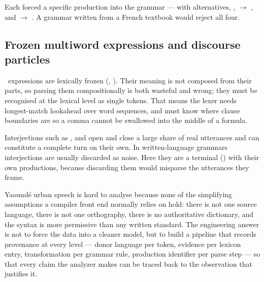 Each forced a specific production into the grammar ---  with 
alternatives, ,  $\rightarrow$ , and
 $\rightarrow$  . A grammar written from
a French textbook would reject all four.

\subsection{Frozen multiword expressions and discourse particles}

\LexiconMultiword\ expressions are lexically frozen (, ). Their meaning is not composed from their parts, so parsing them
compositionally is both wasteful and wrong; they must be recognised at the lexical level
as single  tokens. That means the lexer needs longest-match lookahead over
word sequences, and must know where clause boundaries are so a comma cannot be swallowed
into the middle of a formula.

Interjections such as ,  and  open and close a large share of
real utterances and can constitute a complete turn on their own. In written-language
grammars interjections are usually discarded as noise. Here they are a terminal
() with their own productions, because discarding them would misparse the
utterances they frame.

\begin{keypoint}
Yaound\'e urban speech is hard to analyse because none of the simplifying assumptions a
compiler front end normally relies on hold: there is not one source language, there is not
one orthography, there is no authoritative dictionary, and the syntax is more permissive
than any written standard. The engineering answer is not to force the data into a cleaner
model, but to build a pipeline that records provenance at every level --- donor language per
token, evidence per lexicon entry, transformation per grammar rule, production identifier
per parse step --- so that every claim the analyzer makes can be traced back to the
observation that justifies it.
\end{keypoint}
